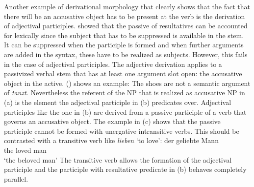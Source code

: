 Another example of derivational morphology that clearly shows that the fact that there will be an
accusative object has to be present at the verb is the derivation of adjectival
participles.
\citet{Alsina96a} showed that the passive of resultatives can be accounted for lexically since the
subject that has to be suppressed is available in the stem. It can be suppressed when the participle
is formed and when further arguments are added in the syntax, these have to be realized as
subjects. However, this fails in the case of adjectival participles. The adjective derivation
applies to a passivized verbal stem that has at least one argument slot open: the accusative object
in the active. () shows an example:
\eal
{}
\zl
The shoes are not a semantic argument of \emph{tanzt}. Nevertheless the referent of the NP that is realized as
accusative NP in (a) is the element the adjectival participle in (b) predicates
over. Adjectival participles like the one in (b) are derived from a passive participle of a
verb that governs an accusative object. The example in (c) shows that the passive participle cannot
be formed with unergative intransitive verbs. This should be contrasted with a transitive verb like
\emph{lieben} `to love':
\ea
\gll der geliebte Mann\\
     the loved    man\\
\glt `the beloved man'
\z
The transitive verb allows the formation of the adjectival participle and the participle with
resultative predicate in (b) behaves completely parallel.

